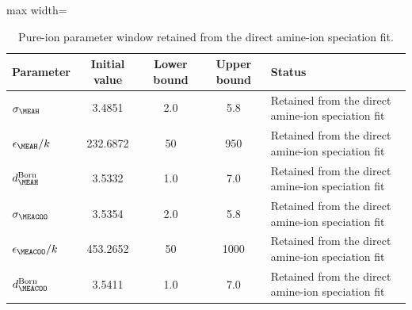 \begin{table}
    \centering
    \caption{Pure-ion parameter window retained from the direct amine-ion speciation fit.}
    \label{tab:regression-bounds}
    \begin{adjustbox}{max width=\textwidth}
    \begin{tabular}{lcccl}
        \toprule
        Parameter & Initial value & Lower bound & Upper bound & Status \\
        \midrule
        $\sigma_{\MEAH}$ & 3.4851 & 2.0 & 5.8 & Retained from the direct amine-ion speciation fit \\
        $\epsilon_{\MEAH}/k$ & 232.6872 & 50 & 950 & Retained from the direct amine-ion speciation fit \\
        $d_{\MEAH}^{\mathrm{Born}}$ & 3.5332 & 1.0 & 7.0 & Retained from the direct amine-ion speciation fit \\
        $\sigma_{\MEACOO}$ & 3.5354 & 2.0 & 5.8 & Retained from the direct amine-ion speciation fit \\
        $\epsilon_{\MEACOO}/k$ & 453.2652 & 50 & 1000 & Retained from the direct amine-ion speciation fit \\
        $d_{\MEACOO}^{\mathrm{Born}}$ & 3.5411 & 1.0 & 7.0 & Retained from the direct amine-ion speciation fit \\
        \bottomrule
    \end{tabular}
    \end{adjustbox}
\end{table}
